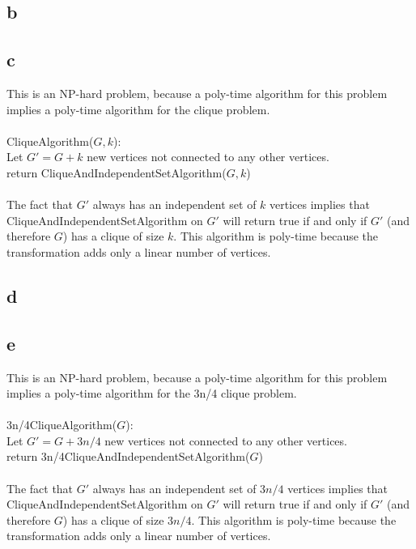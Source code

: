 \documentclass[letterpaper,notitlepage,twoside]{article}
\newcommand\tab[1][1cm]{\hspace*{#1}} %
\begin{document}
\subsection*{b}

\subsection*{c}
This is an NP-hard problem, because a poly-time algorithm for this problem implies a poly-time algorithm for the clique problem.
\\\\
CliqueAlgorithm($G, k$):\\
\tab Let $G' = G + k$ new vertices not connected to any other vertices.\\
\tab return CliqueAndIndependentSetAlgorithm($G, k$)
\\\\
The fact that $G'$ always has an independent set of $k$ vertices implies that CliqueAndIndependentSetAlgorithm on $G'$ will return true if and only if $G'$ (and therefore $G$) has a clique of size $k$. This algorithm is poly-time because the transformation adds only a linear number of vertices.

\subsection*{d}

\subsection*{e}
This is an NP-hard problem, because a poly-time algorithm for this problem implies a poly-time algorithm for the 3n/4 clique problem.
\\\\
3n/4CliqueAlgorithm($G$):\\
\tab Let $G' = G + 3n/4$ new vertices not connected to any other vertices.\\
\tab return 3n/4CliqueAndIndependentSetAlgorithm($G$)
\\\\
The fact that $G'$ always has an independent set of $3n/4$ vertices implies that CliqueAndIndependentSetAlgorithm on $G'$ will return true if and only if $G'$ (and therefore $G$) has a clique of size $3n/4$. This algorithm is poly-time because the transformation adds only a linear number of vertices.
\end{document}
